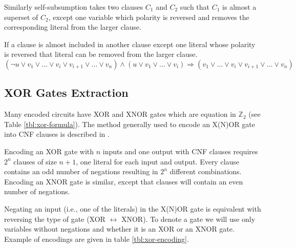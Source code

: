Similarly self-subsumption takes two clauses $C_1$ and $C_2$ such
that $C_1$ is almost a superset of $C_2$, except one variable which
polarity is reversed and removes the corresponding literal from
the larger clause.

\begin{myprop}
  If a clause is almost included in another clause except one literal whose
  polarity is reversed that literal can be removed from the larger clause.
  $(\neg u \lor v_1 \lor \ldots \lor v_i \lor v_{i+1} \lor \ldots \lor v_n)
    \land (u \lor v_1 \lor \ldots \lor v_i)
    \Rightarrow (v_1 \lor \ldots \lor v_i \lor v_{i+1} \lor \ldots \lor v_n)$
\end{myprop}


\subsection{XOR Gates Extraction}
\label{ssec:xor-extraction}

Many encoded circuits have XOR and XNOR gates which are equation
in $\mathbb{Z}_2$ (see Table \ref{tbl:xor-formula}). The method
generally used to encode an X(N)OR gate into CNF clauses is described
in \cite{Roy_restoringcircuit}.

\begin{table}
  \centering

  \caption{XOR/XNOR gates}
  \label{tbl:xor-formula}
\end{table}

Encoding an XOR gate with $n$ inputs and one output with CNF
clauses requires $2^n$ clauses of size $n + 1$, one literal
for each input and output.  Every clause contains an odd number of
negations resulting in $2^n$ different combinations. Encoding an
XNOR gate is similar, except that clauses will contain an even
number of negations.

Negating an input (i.e., one of the literals) in the X(N)OR gate is
equivalent with reversing the type of gate (XOR $\leftrightarrow$
XNOR). To denote a gate we will use only variables without negations
and whether it is an XOR or an XNOR gate.  Example of encodings are
given in table \ref{tbl:xor-encoding}.

